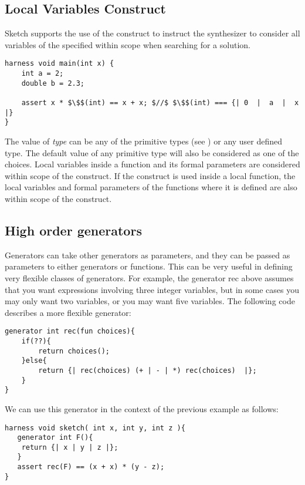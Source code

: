 \subsection{Local Variables Construct}

Sketch supports the use of the  construct to instruct the synthesizer to consider all variables of the specified  within scope when searching for a solution. 

\begin{lstlisting}
harness void main(int x) {
    int a = 2;
    double b = 2.3;
        
    assert x * $\$$(int) == x + x; $//$ $\$$(int) === {| 0  |  a  |  x |}
}
\end{lstlisting}

The value of \textit{type} can be any of the primitive types (see ) or any user defined type. The default value of any primitive type will also be considered as one of the choices. Local variables inside a function and its formal parameters are considered within scope of the construct. If the construct is used inside a local function, the local variables and formal parameters of the functions where it is defined are also within scope of the construct.


\subsection{High order generators}

Generators can take other generators as parameters, and they can be passed as parameters to either generators or functions. This can be very useful in defining very flexible classes of generators. For example, the generator rec above assumes that you want expressions involving three integer variables, but in some cases you may only want two variables, or you may want five variables. The following code describes a more flexible generator: 

\begin{lstlisting}
generator int rec(fun choices){ 
    if(??){ 
        return choices();
    }else{
        return {| rec(choices) (+ | - | *) rec(choices)  |};
    }
}
\end{lstlisting}

We can use this generator in the context of the previous example as follows:
\begin{lstlisting}
harness void sketch( int x, int y, int z ){
   generator int F(){
	return {| x | y | z |};
   }
   assert rec(F) == (x + x) * (y - z);
}
\end{lstlisting}

